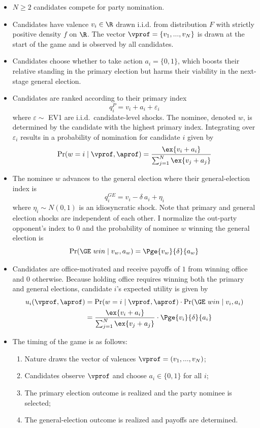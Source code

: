 \documentclass[12pt]{article}
\begin{document}
\begin{itemize}
    \item $N \ge 2$ candidates compete for party nomination.
    \item Candidates have valence $v_i \in \R$ drawn i.i.d. from distribution $F$ with strictly positive density $f$ on $\R$. The vector $\vprof = \{v_1,...,v_N\}$ is drawn at the start of the game and is observed by all candidates.
    \item Candidates choose whether to take action $a_i = \{0,1\}$, which boosts their relative standing in the primary election but harms their viability in the next-stage general election.
    \item Candidates are ranked according to their primary index
    \[
        q_i^P = v_i + a_i + \varepsilon_i
    \]
   where $\varepsilon\sim$ EV1 are i.i.d.\ candidate-level shocks. The nominee, denoted $w$, is determined by the candidate with the highest primary index. Integrating over $\varepsilon_i$ results in a probability of nomination for candidate $i$ given by
   \[
    \Pr(w = i \mid \vprof, \aprof) = \frac{\ex{v_i + a_i}}{\sum_{j=1}^N \ex{v_j + a_j}}
   \]
   \item The nominee $w$ advances to the general election where their general-election index is
   \[
        q_i^{GE} = v_i - \delta\ a_i + \eta_i
   \]
   where $\eta_i \sim N(0,1)$ is an idiosyncratic shock. Note that primary and general election shocks are independent of each other. I normalize the out-party opponent's index to $0$ and the probability of nominee $w$ winning the general election is
   \[
        \Pr(\GE\ win \mid v_w, a_w) = \Pge{v_w}{\delta}{a_w}
   \]
   \item Candidates are office-motivated and receive payoffs of $1$ from winning office and $0$ otherwise. Because holding office requires winning both the primary and general elections, candidate $i$'s expected utility is given by
   \begin{align*}
        u_i(\vprof, \aprof) &= \Pr(w = i \mid \vprof, \aprof)\cdot \Pr(\GE\ win \mid v_i, a_i)\\
        &= \frac{\ex{v_i + a_i}}{\sum_{j=1}^N \ex{v_j+a_j}} \cdot \Pge{v_i}{\delta}{a_i} 
   \end{align*}
   \item The timing of the game is as follows:
   \begin{enumerate}
       \item Nature draws the vector of valences $\vprof = (v_1,...,v_N)$;
       \item Candidates observe $\vprof$ and choose $a_i \in \{0,1\}$ for all $i$;
       \item The primary election outcome is realized and the party nominee is selected;
       \item The general-election outcome is realized and payoffs are determined.
   \end{enumerate}
\end{itemize}
\end{document}
